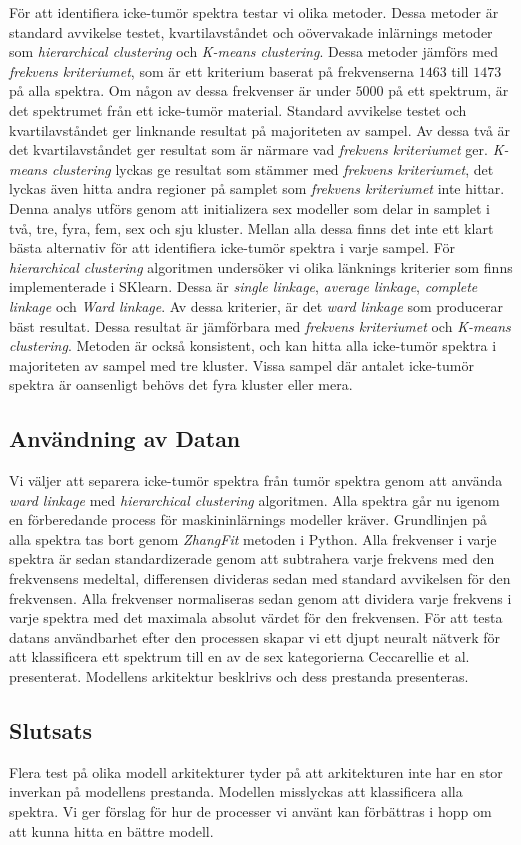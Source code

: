 För att identifiera icke-tumör spektra testar vi olika metoder. Dessa metoder är standard avvikelse testet, kvartilavståndet och oövervakade inlärnings metoder som \textit{hierarchical clustering} och \textit{K-means clustering}. Dessa metoder jämförs med \textit{frekvens kriteriumet}, som är ett kriterium baserat på frekvenserna $1463$ till $1473$ på alla spektra. Om någon av dessa frekvenser är under $5000$ på ett spektrum, är det spektrumet från ett icke-tumör material. Standard avvikelse testet och kvartilavståndet ger linknande resultat på majoriteten av sampel. Av dessa två är det kvartilavståndet ger resultat som är närmare vad \textit{frekvens kriteriumet} ger. \textit{K-means clustering} lyckas ge resultat som stämmer med \textit{frekvens kriteriumet}, det lyckas även hitta andra regioner på samplet som \textit{frekvens kriteriumet} inte hittar. Denna analys utförs genom att initializera sex modeller som delar in samplet i två, tre, fyra, fem, sex och sju kluster. Mellan alla dessa finns det inte ett klart bästa alternativ för att identifiera icke-tumör spektra i varje sampel. För \textit{hierarchical clustering} algoritmen undersöker vi olika länknings kriterier som finns implementerade i SKlearn. Dessa är \textit{single linkage}, \textit{average linkage}, \textit{complete linkage} och \textit{Ward linkage}. Av dessa kriterier, är det \textit{ward linkage} som producerar bäst resultat. Dessa resultat är jämförbara med \textit{frekvens kriteriumet} och \textit{K-means clustering}. Metoden är också konsistent, och kan hitta alla icke-tumör spektra i majoriteten av sampel med tre kluster. Vissa sampel där antalet icke-tumör spektra är oansenligt behövs det fyra kluster eller mera.

\subsection*{Användning av Datan}

Vi väljer att separera icke-tumör spektra från tumör spektra genom att använda \textit{ward linkage} med \textit{hierarchical clustering} algoritmen. Alla spektra går nu igenom en förberedande process för maskininlärnings modeller kräver. Grundlinjen på alla spektra tas bort genom \textit{ZhangFit} metoden i Python. Alla frekvenser i varje spektra är sedan standardizerade genom att subtrahera varje frekvens med den frekvensens medeltal, differensen divideras sedan med standard avvikelsen för den frekvensen. Alla frekvenser normaliseras sedan genom att dividera varje frekvens i varje spektra med det maximala absolut värdet för den frekvensen. För att testa datans användbarhet efter den processen skapar vi ett djupt neuralt nätverk för att klassificera ett spektrum till en av de sex kategorierna Ceccarellie et al. \cite{ceccarelli} presenterat. Modellens arkitektur besklrivs och dess prestanda presenteras. 

\subsection*{Slutsats}

Flera test på olika modell arkitekturer tyder på att arkitekturen inte har en stor inverkan på modellens prestanda. Modellen misslyckas att klassificera alla spektra. Vi ger förslag för hur de processer vi använt kan förbättras i hopp om att kunna hitta en bättre modell. 